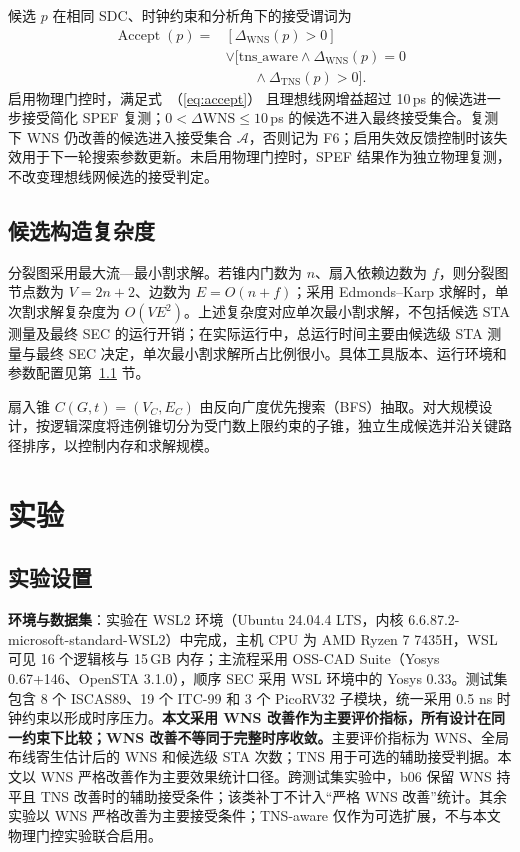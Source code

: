 \documentclass[twocolumn,10pt,fontset=windows]{ctexart}
\renewcommand{\eqref}[1]{\textup{（\ref{#1}）}}
\begin{document}
候选 $p$ 在相同 SDC、时钟约束和分析角下的接受谓词为
\begin{equation}
\label{eq:accept}
\begin{aligned}
\operatorname{Accept}(p)={}&[\Delta_{\mathrm{WNS}}(p)>0]\\
&\lor[\mathrm{tns\_aware}\land\Delta_{\mathrm{WNS}}(p)=0\\
&\qquad\land\Delta_{\mathrm{TNS}}(p)>0].
\end{aligned}
\end{equation}
启用物理门控时，满足式~\eqref{eq:accept} 且理想线网增益超过 10\,ps 的候选进一步接受简化 SPEF 复测；$0<\Delta\mathrm{WNS}\le10\,$ps 的候选不进入最终接受集合。复测下 WNS 仍改善的候选进入接受集合 $\mathcal{A}$，否则记为 F6；启用失效反馈控制时该失效用于下一轮搜索参数更新。未启用物理门控时，SPEF 结果作为独立物理复测，不改变理想线网候选的接受判定。

\subsection{候选构造复杂度}\label{sec:impl}

分裂图采用最大流—最小割求解。若锥内门数为 $n$、扇入依赖边数为 $f$，则分裂图节点数为 $V=2n+2$、边数为 $E=O(n+f)$；采用 Edmonds--Karp 求解时，单次割求解复杂度为 $O(VE^2)$。上述复杂度对应单次最小割求解，不包括候选 STA 测量及最终 SEC 的运行开销；在实际运行中，总运行时间主要由候选级 STA 测量与最终 SEC 决定，单次最小割求解所占比例很小。具体工具版本、运行环境和参数配置见第~\ref{sec:setup} 节。

扇入锥 $C(G, t) = (V_C, E_C)$ 由反向广度优先搜索（BFS）抽取。对大规模设计，按逻辑深度将违例锥切分为受门数上限约束的子锥，独立生成候选并沿关键路径排序，以控制内存和求解规模。

\section{实验}\label{sec:exp}

\subsection{实验设置}\label{sec:setup}

\textbf{环境与数据集}：实验在 WSL2 环境（Ubuntu 24.04.4 LTS，内核 6.6.87.2-microsoft-standard-WSL2）中完成，主机 CPU 为 AMD Ryzen 7 7435H，WSL 可见 16 个逻辑核与 15\,GB 内存；主流程采用 OSS-CAD Suite（Yosys 0.67+146、OpenSTA 3.1.0），顺序 SEC 采用 WSL 环境中的 Yosys 0.33。测试集包含 8 个 ISCAS89、19 个 ITC-99 和 3 个 PicoRV32 子模块，统一采用 0.5 ns 时钟约束以形成时序压力。\textbf{本文采用 WNS 改善作为主要评价指标，所有设计在同一约束下比较；WNS 改善不等同于完整时序收敛。}主要评价指标为 WNS、全局布线寄生估计后的 WNS 和候选级 STA 次数；TNS 用于可选的辅助接受判据。本文以 WNS 严格改善作为主要效果统计口径。跨测试集实验中，b06 保留 WNS 持平且 TNS 改善时的辅助接受条件；该类补丁不计入“严格 WNS 改善”统计。其余实验以 WNS 严格改善为主要接受条件；TNS-aware 仅作为可选扩展，不与本文物理门控实验联合启用。
\end{document}
